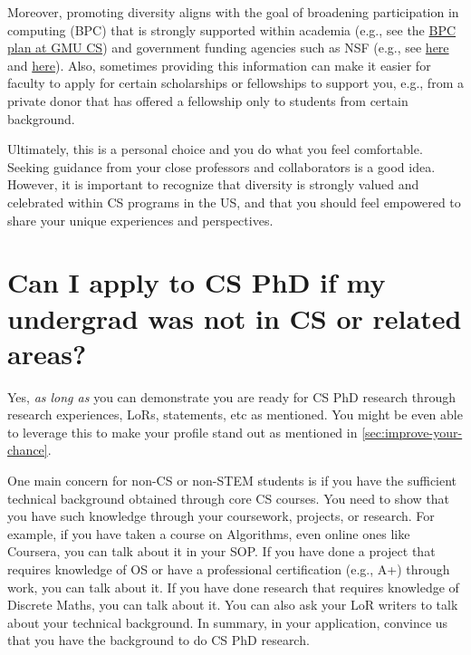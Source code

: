 \documentclass[oneside,11pt,dvipsnames]{book}
\begin{document}
Moreover, promoting diversity aligns with the goal of broadening participation in computing (BPC) that is strongly supported within academia (e.g., see the \href{https://plans.bpcnet.org/GeorgeMasonUniversity_ComputerScience_DepartmentalBPCPlan.pdf}{BPC plan at GMU CS}) and government funding agencies such as NSF (e.g., see \href{https://new.nsf.gov/cise/broadening-participation}{here} and \href{https://www.nsf.gov/pubs/2022/nsf22125/nsf22125.jsp}{here}).
Also, sometimes providing this information can make it easier for faculty to apply for certain scholarships or fellowships to support you, e.g., from a private donor that has offered a fellowship only to students from certain background.

Ultimately, this is a personal choice and you do what you feel comfortable. Seeking guidance from your close professors and collaborators is a good idea. However, it is important to recognize that diversity is strongly valued and celebrated within CS programs in the US, and that you should feel empowered to share your unique experiences and perspectives.





\section{Can I apply to CS PhD if my undergrad was not in CS or related areas?}\label{sec:non-stem}

Yes, \emph{as long as} you can demonstrate you are ready for CS PhD research through research experiences, LoRs, statements, etc as mentioned. You might be even able to leverage this to make your profile stand out as mentioned in \autoref{sec:improve-your-chance}.

One main concern for non-CS or non-STEM students is if you have the sufficient technical background obtained through core CS courses.  You need to show that you have such knowledge through your coursework, projects, or research.
For example, if you have taken a course on Algorithms, even online ones like Coursera, you can talk about it in your SOP.  If you have done a project that requires knowledge of OS or have a professional certification (e.g., A+) through work, you can talk about it.  If you have done research that requires knowledge of Discrete Maths, you can talk about it.  You can also ask your LoR writers to talk about your technical background.
In summary, in your application, convince us that you have the background to do CS PhD research.
\end{document}
